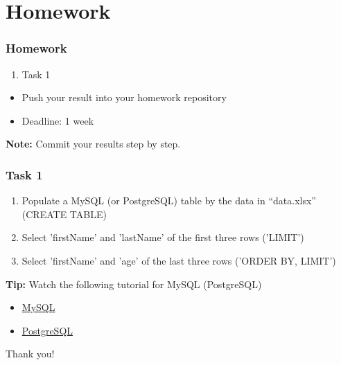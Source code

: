 \documentclass{beamer}
\begin{document}
\section{Homework} 

\begin{frame}
    \frametitle{Homework}
    \begin{enumerate}
        \item Task 1
    \end{enumerate}

    \vskip 2mm
    \begin{itemize}
        \item Push your result into your homework repository
        \item Deadline: 1 week %
    \end{itemize}

\vfill
\textbf{Note:} Commit your results step by step.
\end{frame}

\begin{frame}
    \frametitle{Task 1}
    \begin{enumerate}
        \item Populate a MySQL (or PostgreSQL) table by the data in “data.xlsx” (CREATE TABLE)
        \item Select 'firstName' and 'lastName' of the first three rows  ('LIMIT')
        \item Select 'firstName' and 'age' of the last three rows ('ORDER BY, LIMIT')
    \end{enumerate}
\vfill
\textbf{Tip:} Watch the following tutorial for MySQL (PostgreSQL)
\begin{itemize}
    \item \href{https://www.youtube.com/watch?v=e1LPfehYSgg&list=PLS1QulWo1RIY4auvfxAHS9m_fZJ2wxSse}{MySQL}
    \item \href{https://www.youtube.com/watch?v=xaWlS9HtWYw}{PostgreSQL}
\end{itemize}
\end{frame}

\begin{frame}
\Huge{\centerline{Thank you!}}
\end{frame}

\end{document}
